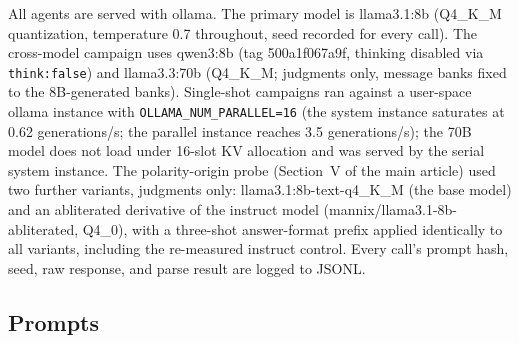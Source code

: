 \documentclass[11pt]{article}
\begin{document}
All agents are served with ollama. The primary model is llama3.1:8b
(Q4\_K\_M quantization, temperature 0.7 throughout, seed recorded for every
call). The cross-model campaign uses qwen3:8b (tag 500a1f067a9f, thinking
disabled via \texttt{think:false}) and llama3.3:70b (Q4\_K\_M; judgments
only, message banks fixed to the 8B-generated banks). Single-shot campaigns
ran against a user-space ollama instance with \texttt{OLLAMA\_NUM\_PARALLEL=16}
(the system instance saturates at 0.62 generations/s; the parallel instance
reaches 3.5 generations/s); the 70B model does not load under 16-slot KV
allocation and was served by the serial system instance. The polarity-origin probe (Section~V of the main article) used two further variants, judgments
only: llama3.1:8b-text-q4\_K\_M (the base model) and an abliterated derivative
of the instruct model (mannix/llama3.1-8b-abliterated, Q4\_0), with a
three-shot answer-format prefix applied identically to all variants,
including the re-measured instruct control. Every call's prompt
hash, seed, raw response, and parse result are logged to JSONL.

\subsection{Prompts}
\end{document}
